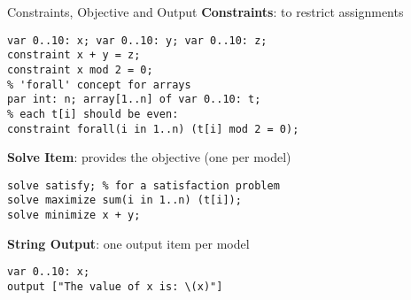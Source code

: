 \begin{frame}[fragile]{Constraints, Objective and Output}
\textbf{Constraints}: to restrict assignments 
\begin{lstlisting}
var 0..10: x; var 0..10: y; var 0..10: z;
constraint x + y = z;
constraint x mod 2 = 0;
% 'forall' concept for arrays
par int: n; array[1..n] of var 0..10: t; 
% each t[i] should be even:
constraint forall(i in 1..n) (t[i] mod 2 = 0);
\end{lstlisting}
\pause 

\vspace*{1ex}

\textbf{Solve Item}: provides the objective (one per model)
\begin{lstlisting}
solve satisfy; % for a satisfaction problem
solve maximize sum(i in 1..n) (t[i]);
solve minimize x + y;
\end{lstlisting}
\pause 
\vspace*{1ex}

\textbf{String Output}: one output item per model
\begin{lstlisting}
var 0..10: x;
output ["The value of x is: \(x)"]
\end{lstlisting}
\end{frame}
